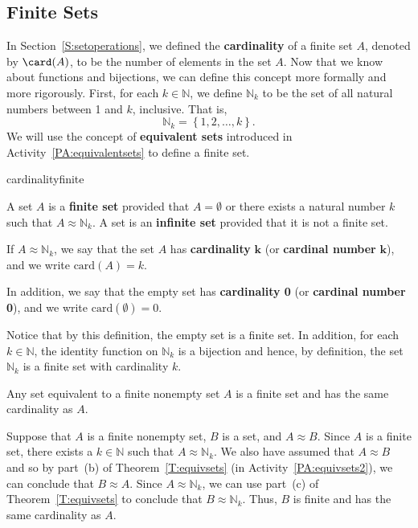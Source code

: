\subsection*{Finite Sets}
In Section~\ref{S:setoperations}, we defined the \textbf{cardinality}
%
 of a finite set $A$, denoted by $\card (A)$, to be the number of elements in the set $A$.  Now that we know about functions and bijections, we can define this concept more formally and more rigorously.  First, for each $k \in \mathbb{N}$, we define $\mathbb{N}_k$ to be the set of all natural numbers between 1 and $k$, inclusive.  That is,
\label{sym:firstk}
\[
\mathbb{N}_k = \left\{ 1, 2, \ldots, k \right\}\!.
\]
We will use the concept of \textbf{equivalent sets}
%
 introduced in \typeu Activity~\ref*{PA:equivalentsets} to define a finite set.

\begin{defbox}{cardinalityfinite}{A set $A$ is a \textbf{finite set}
%
%
 provided that $A = \emptyset$ or there exists a natural number $k$ such that 
$A \approx \mathbb{N}_k$.  A set is an \textbf{infinite set}
%
 provided that it is not a finite set.

If $A \approx \mathbb{N}_k$, we say that the set $A$ has \textbf{cardinality}
%
 $\boldsymbol{k}$ (or \textbf{cardinal number}
%
 $\boldsymbol{k}$), and we write  $\text{card} \left( A \right) = k$.  \label{sym:cardk} 

In addition, we say that the empty set has \textbf{cardinality 0} (or \textbf{cardinal number 0}), and we write $\text{card} \left( \emptyset \right) = 0$.}
\end{defbox}
%
Notice that by this definition, the empty set is a finite set.  In addition, for each 
$k \in \mathbb{N}$, the identity function on $\mathbb{N}_k$ is a bijection and hence, by definition, the set $\mathbb{N}_k$ is a finite set with cardinality $k$.

\begin{theorem}\label{T:equivfinitesets}
Any set equivalent to a finite nonempty set $A$ is a finite set and has the same cardinality as 
$A$.
\end{theorem}
%
\begin{myproof}
Suppose that $A$ is a finite nonempty set, $B$ is a set, and $A \approx B$.  Since $A$ is a finite set, there exists a $k \in \mathbb{N}$ such that $A \approx \mathbb{N}_k$.  We also have assumed that $A \approx B$ and so by part~(b) of Theorem~\ref{T:equivsets} (in \typeu Activity~\ref*{PA:equivsets2}), we can conclude that 
$B \approx A$.  Since $A \approx \mathbb{N}_k$, we can use part~(c) of Theorem~\ref{T:equivsets} to conclude that $B \approx \mathbb{N}_k$.  Thus, $B$ is finite and has the same cardinality as $A$.
\end{myproof}

